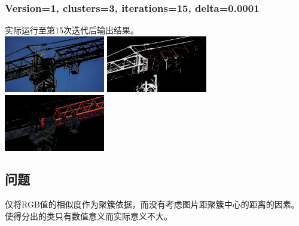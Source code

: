 \documentclass{article}
\begin{document}
\subsubsection{Version=1, clusters=3, iterations=15, delta=0.0001}
实际运行至第15次迭代后输出结果。\\
\includegraphics[width=0.33\textwidth]{src/v2_i15d1e-4section1.png}
\includegraphics[width=0.33\textwidth]{src/v2_i15d1e-4section2.png}
\includegraphics[width=0.33\textwidth]{src/v2_i15d1e-4section3.png}\\
\subsection{问题}
仅将RGB值的相似度作为聚簇依据，而没有考虑图片距聚簇中心的距离的因素。使得分出的类只有数值意义而实际意义不大。
\end{document}
